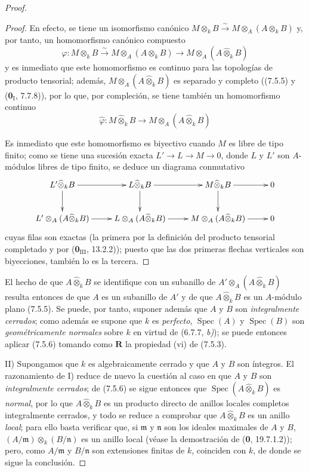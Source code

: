 \begin{proof}
\begin{proof}
En efecto, se tiene un isomorfismo canónico
$M\otimes_kB\xrightarrow{\sim}M\otimes_A(A\otimes_kB)$ y, por tanto, un homomorfismo
canónico compuesto
\[
\varphi:M\otimes_kB\xrightarrow{\sim}M\otimes_A(A\otimes_kB)
\longrightarrow M\otimes_A(A\widehat\otimes_kB)
\]
y es inmediato que este homomorfismo es continuo para las topologías
de producto tensorial; además, $M\otimes_A(A\widehat\otimes_kB)$ es separado y
completo ((7.5.5) y (\textbf 0$_{\mathrm I}$, 7.7.8)), por lo que, por compleción, se tiene
también un homomorfismo continuo
\[
\widehat\varphi:M\widehat\otimes_kB\longrightarrow
M\otimes_A(A\widehat\otimes_kB)
\]


Es inmediato que este homomorfismo es biyectivo cuando $M$ es libre de
tipo finito; como se tiene una sucesión exacta $L'\to L\to M\to0$, donde $L$ y $L'$
son $A$-módulos libres de tipo finito, se deduce un diagrama conmutativo
\[
\xymatrix{
L'\widehat\otimes_kB \ar[r] \ar[d] &
L\widehat\otimes_kB \ar[r] \ar[d] &
M\widehat\otimes_kB \ar[r] \ar[d] & 0 \\
L'\otimes_A(A\widehat\otimes_kB) \ar[r] &
L\otimes_A(A\widehat\otimes_kB) \ar[r] &
M\otimes_A(A\widehat\otimes_kB) \ar[r] & 0
}
\]
cuyas filas son exactas (la primera por la definición del producto
tensorial completado y por (\textbf 0$_{\mathrm{III}}$, 13.2.2)); puesto que las dos primeras
flechas verticales son biyecciones, también lo es la tercera.
\end{proof}

El hecho de que $A\widehat\otimes_kB$ se identifique con un subanillo de
$A'\otimes_A(A\widehat\otimes_kB)$ resulta entonces de que $A$ es un
subanillo de $A'$ y de que $A\widehat\otimes_kB$ es un $A$-módulo plano
(7.5.5). Se puede, por tanto, suponer además que $A$ y $B$ son \emph{integralmente
cerrados}; como además se supone que $k$ es \emph{perfecto}, $\operatorname{Spec}(A)$ y
$\operatorname{Spec}(B)$ son \emph{geométricamente normales} sobre $k$ en virtud de
(6.7.7, \emph{b)}); se puede entonces aplicar (7.5.6) tomando como
$\boldsymbol R$ la propiedad (vi) de (7.5.3).

II) Supongamos que $k$ es algebraicamente cerrado y que $A$ y $B$ son íntegros.
El razonamiento de I) reduce de nuevo la cuestión al caso en que $A$ y $B$ son \emph{integralmente
cerrados}; de (7.5.6) se sigue entonces que $\operatorname{Spec}(A\widehat\otimes_kB)$
es \emph{normal}, por lo que $A\widehat\otimes_kB$ es un producto directo de anillos
locales completos integralmente cerrados, y todo se reduce a comprobar que
$A\widehat\otimes_kB$ es un anillo \emph{local}; para ello basta verificar que, si $\mathfrak m$ y
$\mathfrak n$ son los ideales maximales de $A$ y $B$,
$(A/\mathfrak m)\otimes_k(B/\mathfrak n)$ es un anillo local (véase la
demostración de (\textbf 0, 19.7.1.2)); pero, como $A/\mathfrak m$ y
$B/\mathfrak n$ son extensiones finitas de $k$, coinciden con
$k$, de donde se sigue la conclusión.
\end{proof}
